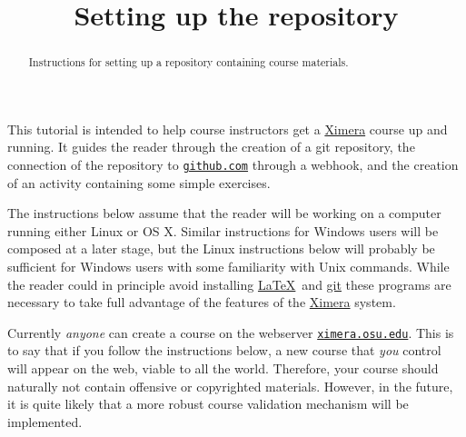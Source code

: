 \documentclass{ximera}
\title{Setting up the repository}
\begin{document}
\begin{abstract}
Instructions for setting up a repository containing course materials.
\end{abstract}
\maketitle

This tutorial is intended to help course instructors get a
\href{http://ximera.osu.edu}{\sf Ximera} 
course up and running. It guides the reader through the creation of 
a git repository, the connection of the repository to
\href{http://github.com}{\tt github.com}
through a webhook, and the creation of an activity containing some 
simple exercises.

The instructions below assume that the reader will be
working on a computer running either Linux or OS X.
Similar instructions for Windows users will be composed
at a later stage, but the Linux instructions below will probably
be sufficient for Windows users with some familiarity with Unix commands.
While the reader could in principle avoid installing 
\href{http://texlive.org}{\LaTeX}\ and
\href{http://git-scm.com}{\sf git} these programs are necessary
to take full advantage of the features of the 
\href{http://ximera.osu.edu}{\sf Ximera} system.

\begin{warning} Currently {\em anyone} can
create a course on the webserver
\href{http://ximera.osu.edu}{\tt ximera.osu.edu}.
This is to say that if you follow the instructions below,
a new course that {\em you} control will appear on the web,
viable to all the world. Therefore,
your course should naturally not contain offensive or copyrighted
materials. However, in the future, it is quite likely that a
more robust course validation mechanism will be implemented.
\end{warning}
\end{document}
